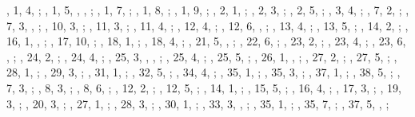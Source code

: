 \begin{autindex}
    ,  1,  4, ;
    ,  1,  5, , , ;
    ,  1,  7, ;
    ,  1,  8, ;
    ,  1,  9, ;
    ,  2,  1, ;
    ,  2,  3, ;
    ,  2,  5, ;
    ,  3,  4, ;
    ,  7,  2, ;
    ,  7,  3, , ;
    , 10,  3, ;
    , 11,  3, ;
    , 11,  4, ;
    , 12,  4, ;
    , 12,  6, , ;
    , 13,  4, ;
    , 13,  5, ;
    , 14,  2, ;
    , 16,  1, , ;
    , 17, 10, ;
    , 18,  1, ;
    , 18,  4, ;
    , 21,  5, , ;
    , 22,  6, ;
    , 23,  2, ;
    , 23,  4, ;
    , 23,  6, , ;
    , 24,  2, ;
    , 24,  4, ;
    , 25,  3, , , ;
    , 25,  4, ;
    , 25,  5, ;
    , 26,  1, , ;
    , 27,  2, ;
    , 27,  5, ;
    , 28,  1, ;
    , 29,  3, ;
    , 31,  1, ;
    , 32,  5, ;
    , 34,  4, ;
    , 35,  1, ;
    , 35,  3, ;
    , 37,  1, ;
    , 38,  5, ;
    ,  7,  3, ;
    ,  8,  3, ;
    ,  8,  6, ;
    , 12,  2, ;
    , 12,  5, ;
    , 14,  1, ;
    , 15,  5, ;
    , 16,  4, ;
    , 17,  3, ;
    , 19,  3, ;
    , 20,  3, ;
    , 27,  1, ;
    , 28,  3, ;
    , 30,  1, ;
    , 33,  3, , ;
    , 35,  1, ;
    , 35,  7, ;
    , 37,  5, , ;

\end{autindex}
